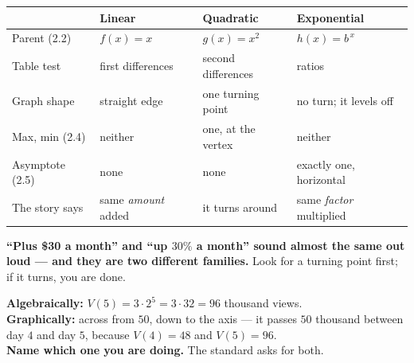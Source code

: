 \documentclass[aspectratio=169, 11pt]{beamer}
\begin{document}
\begin{frame}[t, plain]
  \renewcommand{\arraystretch}{1.3}
  \small
  \begin{tabularx}{\textwidth}{@{}p{2.6cm}|X|X|X@{}}
    & \textbf{Linear} & \textbf{Quadratic} & \textbf{Exponential} \\
    \hline
    Parent (2.2) & $f(x)=x$ & $g(x)=x^2$ & $h(x)=b^{\,x}$ \\
    Table test & first differences & second differences & ratios \\
    Graph shape & straight edge & one turning point & no turn; it levels off \\
    Max, min (2.4) & neither & one, at the vertex & neither \\
    Asymptote (2.5) & none & none & exactly one, horizontal \\
    The story says & same \emph{amount} added & it turns around & same \emph{factor} multiplied \\
  \end{tabularx}
  \vspace{0.3cm}

  \textbf{``Plus \$30 a month'' and ``up $30\%$ a month'' sound almost the same out loud --- and they
  are two different families.} Look for a turning point first; if it turns, you are done.
\end{frame}

\begin{frame}[t, plain]
  \begin{center}
  \end{center}
  \vspace{-0.35cm}
  \small
  \textbf{Algebraically:} $V(5) = 3 \cdot 2^5 = 3 \cdot 32 = 96$ thousand views.\\[0.1cm]
  \textbf{Graphically:} across from $50$, down to the axis --- it passes $50$ thousand between day
  $4$ and day $5$, because $V(4)=48$ and $V(5)=96$.\\[0.1cm]
  \textbf{Name which one you are doing.} The standard asks for both.
\end{frame}
\end{document}
